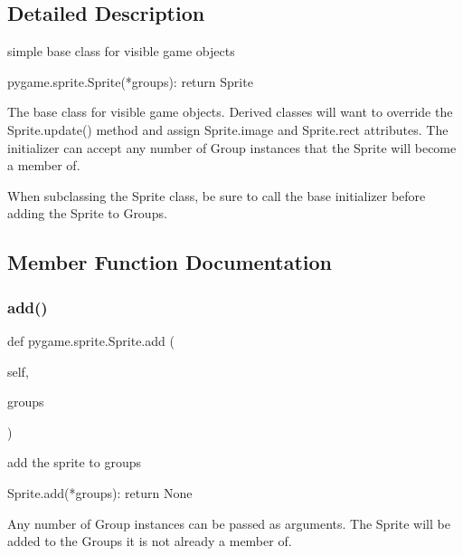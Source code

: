 \subsection{Detailed Description}
\begin{DoxyVerb}simple base class for visible game objects

pygame.sprite.Sprite(*groups): return Sprite

The base class for visible game objects. Derived classes will want to
override the Sprite.update() method and assign Sprite.image and Sprite.rect
attributes.  The initializer can accept any number of Group instances that
the Sprite will become a member of.

When subclassing the Sprite class, be sure to call the base initializer
before adding the Sprite to Groups.\end{DoxyVerb}
 

\subsection{Member Function Documentation}
\mbox{\label{classpygame_1_1sprite_1_1_sprite_a9b368933bac409bcd4adfa0c2d18007a}} 
\subsubsection{\texorpdfstring{add()}{add()}}
{\footnotesize\ttfamily def pygame.\+sprite.\+Sprite.\+add (\begin{DoxyParamCaption}\item[{}]{self,  }\item[{}]{groups }\end{DoxyParamCaption})}

\begin{DoxyVerb}add the sprite to groups

Sprite.add(*groups): return None

Any number of Group instances can be passed as arguments. The
Sprite will be added to the Groups it is not already a member of.\end{DoxyVerb}
 \mbox{\label{classpygame_1_1sprite_1_1_sprite_a037be0ccbcd4f4fcefa857ea12fb50f5}} 
